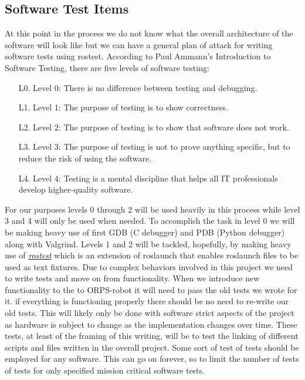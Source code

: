 \documentclass[english,12pt]{article}
\begin{document}
\begin{table}[htp]
{\begin{tabular}{|c|c|c|c|c|c|c|}
\end{tabular}%
}
\end{table}
\subsection{Software Test Items}
At this point in the process we do not know what the overall architecture of the software will 
look like but we can have a general plan of attack for writing software tests using rostest. According 
to Paul Ammann's Introduction to Software Testing, there are five levels of software testing: \\
\begin{itemize}
    \item[L0.] Level 0: There is no difference between testing and debugging.
    \item[L1.] Level 1: The purpose of testing is to show correctness.
    \item[L2.] Level 2: The purpose of testing is to show that software does not work.
    \item[L3.] Level 3: The purpose of testing is not to prove anything specific, 
    but to reduce the risk of using the software.
    \item[L4.] Level 4: Testing is a mental discipline that helps all IT professionals 
    develop higher-quality software.
\end{itemize}
For our purposes levels 0 through 2 will be used heavily in this process while level 3 and 4 will 
only be used when needed. To accomplish the task in level 0 we will be making heavy use of first 
GDB (C debugger) and PDB (Python debugger) along with Valgrind. Levels 1 and 2 will be tackled, 
hopefully, by making heavy use of \href{http://wiki.ros.org/rostest}{\textit{rostest}} which is an 
extension of roslaunch that enables roslaunch files to be used as text fixtures. Due to complex 
behaviors involved in this project we need to write tests and move on from functionality. When we 
introduce new functionality to the to ORPS-robot it will need to pass the old tests we wrote for it. 
if everything is functioning properly there should be no need to re-write our old tests. This will 
likely only be done with software strict aspects of the project as hardware is subject to change as 
the implementation changes over time. These tests, at least of the framing of this writing, will be 
to test the linking of different scripts and files written in the overall project. Some sort of test 
of tests should be employed for any software. This can go on forever, so to limit the number of tests 
of tests for only specified mission critical software tests.
\end{document}
